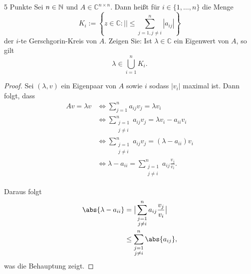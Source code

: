 \documentclass{problemset}
\author{Michael van Straten}
\begin{document}
\maketitle

\setcounter{problem}{2}

\begin{problem}{5 Punkte}
Sei \( n \in \mathbb{N} \) und \( A \in \mathbb{C}^{n \times n} \). Dann heißt für
\( i \in \{1, \ldots, n\} \) die Menge
\[
    K_i := \left\{ z \in \mathbb{C} : || \leq \sum_{j=1, j \neq i}^n |a_{ij}| \right\}
\]
der \( i \)-te Gerschgorin-Kreis von \( A \). Zeigen Sie: Ist \( \lambda \in
  \mathbb{C} \) ein Eigenwert von \( A \), so gilt
\[
    \lambda \in \bigcup_{i=1}^n K_i.
\]
\begin{proof}
    Sei \((\lambda, v)\) ein Eigenpaar von \(A\) sowie \(i\) sodass \(|v_i|\)
    maximal ist. Dann folgt, dass \newcommand{\idx}{\substack{j=1 \\ j \neq i}}
    \begin{align*}
        Av = \lambda v & \iff \sum_{j=1}^n a_{ij} v_j = \lambda v_i                    \\
                       & \iff \sum_{\idx}^n a_{ij} v_j = \lambda v_i - a_{ii} v_i      \\
                       & \iff \sum_{\idx}^n a_{ij} v_j = (\lambda - a_{ii}) v_i        \\
                       & \iff \lambda - a_{ii} = \sum_{\idx}^n a_{ij} \frac{v_j}{v_i}.
    \end{align*}

    Daraus folgt
    \begin{align*}
        \abs{\lambda - a_{ii}}
         & = \big| \sum_{\idx}^n a_{ij} \frac{v_j}{v_i} \big| \\
         & \le \sum_{\idx}^n \abs{a_{ij}},
    \end{align*}
    was die Behauptung zeigt.
\end{proof}
\end{problem}
\end{document}
